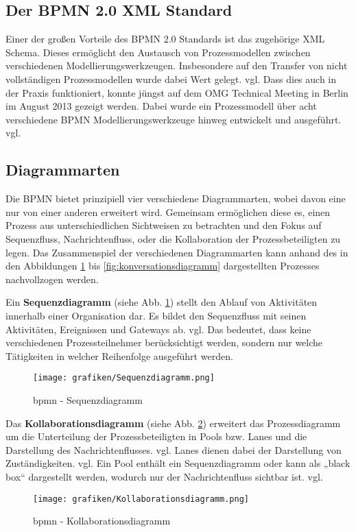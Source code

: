 \subsection{Der BPMN 2.0 XML Standard}
Einer der großen Vorteile des \ac{BPMN} 2.0 Standards ist das zugehörige XML Schema. Dieses ermöglicht den Austausch von Prozessmodellen zwischen verschiedenen Modellierungswerkzeugen. Insbesondere auf den Transfer von nicht vollständigen Prozessmodellen wurde dabei Wert gelegt. vgl.\cite[S.475]{ObjectManagementGroup.2011}
Dass dies auch in der Praxis funktioniert, konnte jüngst auf dem \ac{OMG} Technical Meeting in Berlin im August 2013 gezeigt werden. Dabei wurde ein Prozessmodell über acht verschiedene \ac{BPMN} Modellierungswerkzeuge hinweg entwickelt und ausgeführt. vgl.\cite{FalkoMenge.2013}

\subsection{Diagrammarten}
\label{diagrammarten}
Die \ac{BPMN} bietet prinzipiell vier verschiedene Diagrammarten, wobei davon eine nur von einer anderen erweitert wird. Gemeinsam ermöglichen diese es, einen Prozess aus unterschiedlichen Sichtweisen zu betrachten und den Fokus auf Sequenzfluss, Nachrichtenfluss, oder die Kollaboration der Prozessbeteiligten zu legen. Das Zusammenspiel der verschiedenen Diagrammarten kann anhand des in den Abbildungen \ref{fig:sequenzdiagramm} bis \ref{fig:konversationsdiagramm} dargestellten Prozesses nachvollzogen werden.

\medskip\noindent Ein \textbf{Sequenzdiagramm} (siehe Abb. \ref{fig:sequenzdiagramm}) stellt den Ablauf von Aktivitäten innerhalb einer Organisation dar. Es bildet den Sequenzfluss mit seinen Aktivitäten, Ereignissen und Gateways ab. vgl.\cite[S.107]{ObjectManagementGroup.2011} Das bedeutet, dass keine verschiedenen Prozessteilnehmer berücksichtigt werden, sondern nur welche Tätigkeiten in welcher Reihenfolge ausgeführt werden.
\begin{figure}[!h]
	\caption{bpmn - Sequenzdiagramm}
	\centering
		\texttt{[image: grafiken/Sequenzdiagramm.png]}	
	\label{fig:sequenzdiagramm}
\end{figure}

\medskip\noindent Das \textbf{Kollaborationsdiagramm} (siehe Abb. \ref{fig:kollaborationsdiagramm}) erweitert das Prozessdiagramm um die Unterteilung der Prozessbeteiligten in Pools bzw. Lanes und die Darstellung des Nachrichtenflusses. vgl.\cite[S.107]{ObjectManagementGroup.2011} Lanes dienen dabei der Darstellung von Zuständigkeiten. vgl.\cite[S.44+45]{Freund.2010} Ein Pool enthält ein Sequenzdiagramm oder kann als „black box“ dargestellt werden, wodurch nur der Nachrichtenfluss sichtbar ist. vgl.\cite[S.112]{ObjectManagementGroup.2011}
\begin{figure}[!h]
	\caption{bpmn - Kollaborationsdiagramm}
	\centering
		\texttt{[image: grafiken/Kollaborationsdiagramm.png]}	
	\label{fig:kollaborationsdiagramm}
\end{figure}

